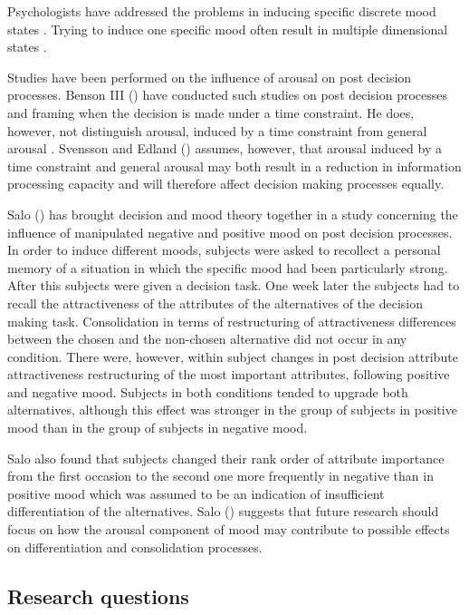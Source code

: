 \documentclass[jou,11pt]{apa6}
\begin{document}
Psychologists have addressed the problems in inducing specific
discrete mood states \parencite{Izard77, Polivy81}.  Trying to induce
one specific mood often result in multiple dimensional states
\parencite{Polivy81}.

Studies have been performed on the influence of arousal on post
decision processes.  Benson III (\citeyear{Benson93}) have conducted
such studies on 
post decision processes and framing when the decision is made under a
time constraint.  He does, however, not distinguish arousal, induced
by a time constraint from general arousal \parencite{Benson93,
  Svensson96}.  Svensson and Edland (\citeyear{SvenssonEdland87})
assumes, however, that arousal induced by a time constraint and
general arousal may both result in a reduction in information
processing capacity and will therefore affect decision making
processes equally.

Salo (\citeyear{Salo96}) has brought decision and mood theory together
in a study concerning the influence of manipulated negative and
positive mood on post decision processes.  In order to induce
different moods, subjects were asked to recollect a personal memory of
a situation in which the specific mood had been particularly strong.
After this subjects were given a decision task.  One week later the
subjects had to recall the attractiveness of the attributes of the
alternatives  of the decision making task.  Consolidation in terms of
restructuring of attractiveness differences between the chosen and the
non-chosen alternative did not occur in any condition.  There were,
however, within subject changes in post decision attribute
attractiveness restructuring of  the most important attributes,
following positive and negative mood.  Subjects in both conditions
tended to upgrade both alternatives, although this effect was stronger
in the group of subjects in positive mood than in the group of
subjects in negative mood.

Salo also found that subjects changed their rank order of attribute
importance from the first occasion to the second one more frequently
in negative than in positive mood which was assumed to be an
indication of insufficient differentiation of the alternatives.  Salo
(\citeyear{Salo96}) suggests that future research should focus on how
the arousal component of mood may contribute to possible effects on
differentiation and consolidation processes.


\subsection{Research questions}
\end{document}
